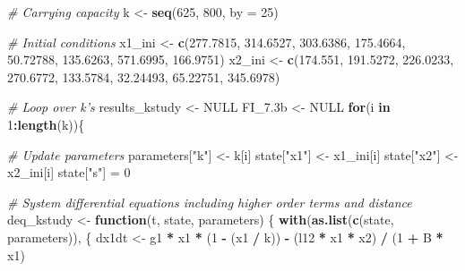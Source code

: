 \documentclass[12pt,twoside,openany]{reedthesis}
\newenvironment{Shaded}{\begin{snugshade}}{\end{snugshade}}
\newcommand{\CommentTok}[1]{\textcolor[rgb]{0.56,0.35,0.01}{\textit{#1}}}
\newcommand{\ControlFlowTok}[1]{\textcolor[rgb]{0.13,0.29,0.53}{\textbf{#1}}}
\newcommand{\DataTypeTok}[1]{\textcolor[rgb]{0.13,0.29,0.53}{#1}}
\newcommand{\DecValTok}[1]{\textcolor[rgb]{0.00,0.00,0.81}{#1}}
\newcommand{\FloatTok}[1]{\textcolor[rgb]{0.00,0.00,0.81}{#1}}
\newcommand{\KeywordTok}[1]{\textcolor[rgb]{0.13,0.29,0.53}{\textbf{#1}}}
\newcommand{\NormalTok}[1]{#1}
\newcommand{\OperatorTok}[1]{\textcolor[rgb]{0.81,0.36,0.00}{\textbf{#1}}}
\newcommand{\OtherTok}[1]{\textcolor[rgb]{0.56,0.35,0.01}{#1}}
\newcommand{\StringTok}[1]{\textcolor[rgb]{0.31,0.60,0.02}{#1}}
\begin{document}
\begin{Shaded}
\begin{Highlighting}[]
\CommentTok{# Carrying capacity}
\NormalTok{k <-}\StringTok{ }\KeywordTok{seq}\NormalTok{(}\DecValTok{625}\NormalTok{, }\DecValTok{800}\NormalTok{, }\DataTypeTok{by =} \DecValTok{25}\NormalTok{)}

\CommentTok{# Initial conditions}
\NormalTok{x1_ini <-}\StringTok{ }\KeywordTok{c}\NormalTok{(}\FloatTok{277.7815}\NormalTok{,}
          \FloatTok{314.6527}\NormalTok{,}
          \FloatTok{303.6386}\NormalTok{,}
          \FloatTok{175.4664}\NormalTok{,}
          \FloatTok{50.72788}\NormalTok{,}
          \FloatTok{135.6263}\NormalTok{,}
          \FloatTok{571.6995}\NormalTok{,}
          \FloatTok{166.9751}\NormalTok{)}
\NormalTok{x2_ini <-}\StringTok{ }\KeywordTok{c}\NormalTok{(}\FloatTok{174.551}\NormalTok{,}
          \FloatTok{191.5272}\NormalTok{,}
          \FloatTok{226.0233}\NormalTok{,}
          \FloatTok{270.6772}\NormalTok{,}
          \FloatTok{133.5784}\NormalTok{,}
          \FloatTok{32.24493}\NormalTok{,}
          \FloatTok{65.22751}\NormalTok{,}
          \FloatTok{345.6978}\NormalTok{)}

\CommentTok{# Loop over k's}
\NormalTok{results_kstudy <-}\StringTok{ }\OtherTok{NULL}
\NormalTok{FI_}\FloatTok{7.3}\NormalTok{b <-}\StringTok{ }\OtherTok{NULL}
\ControlFlowTok{for}\NormalTok{(i }\ControlFlowTok{in} \DecValTok{1}\OperatorTok{:}\KeywordTok{length}\NormalTok{(k))\{}
  
  \CommentTok{# Update parameters}
\NormalTok{  parameters[}\StringTok{"k"}\NormalTok{] <-}\StringTok{ }\NormalTok{k[i]}
\NormalTok{  state[}\StringTok{"x1"}\NormalTok{] <-}\StringTok{ }\NormalTok{x1_ini[i]}
\NormalTok{  state[}\StringTok{"x2"}\NormalTok{] <-}\StringTok{ }\NormalTok{x2_ini[i]}
\NormalTok{  state[}\StringTok{"s"}\NormalTok{] =}\StringTok{ }\DecValTok{0}
  
  \CommentTok{# System differential equations including higher order terms and distance}
\NormalTok{  deq_kstudy <-}\StringTok{ }\ControlFlowTok{function}\NormalTok{(t, state, parameters) \{}
    \KeywordTok{with}\NormalTok{(}\KeywordTok{as.list}\NormalTok{(}\KeywordTok{c}\NormalTok{(state, parameters)), \{}
\NormalTok{      dx1dt <-}\StringTok{ }\NormalTok{g1 }\OperatorTok{*}\StringTok{ }\NormalTok{x1 }\OperatorTok{*}\StringTok{ }\NormalTok{(}\DecValTok{1} \OperatorTok{-}\StringTok{ }\NormalTok{(x1 }\OperatorTok{/}\StringTok{ }\NormalTok{k)) }\OperatorTok{-}\StringTok{ }\NormalTok{(l12 }\OperatorTok{*}\StringTok{ }\NormalTok{x1 }\OperatorTok{*}\StringTok{ }\NormalTok{x2) }\OperatorTok{/}\StringTok{ }\NormalTok{(}\DecValTok{1} \OperatorTok{+}\StringTok{ }\NormalTok{B }\OperatorTok{*}\StringTok{ }\NormalTok{x1)}
      

\end{Highlighting}
\end{Shaded}
\end{document}
